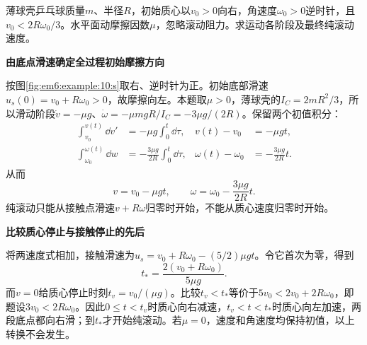\begin{question}\begin{example}[反向自转乒乓球的滑动与回滚]\label{em6:example:10}
薄球壳乒乓球质量$m$、半径$R$，初始质心以$v_0>0$向右，角速度$\omega_0>0$逆时针，且$v_0<2R\omega_0/3$。水平面动摩擦因数$\mu$，忽略滚动阻力。求运动各阶段及最终纯滚动速度。
\end{example}
\end{question}
\begin{solution}\textbf{由底点滑速确定全过程初始摩擦方向}\par\nobreak
按图\ref{fig:em6:example:10:s}取右、逆时针为正。初始底部滑速$u_s(0)=v_0+R\omega_0>0$，故摩擦向左。本题取$\mu>0$，薄球壳的$I_C=2mR^2/3$，所以滑动阶段$\dot v=-\mu g$、$\dot\omega=-\mu mgR/I_C=-3\mu g/(2R)$。保留两个初值积分：
\[
 \begin{aligned}
 \int_{v_0}^{v(t)}\dd v'&=-\mu g\int_0^t\dd\tau,
 &v(t)-v_0&=-\mu gt,\\
 \int_{\omega_0}^{\omega(t)}\dd w&=-\frac{3\mu g}{2R}\int_0^t\dd\tau,
 &\omega(t)-\omega_0&=-\frac{3\mu g}{2R}t.
 \end{aligned}
\]
从而
\[v=v_0-\mu gt,\qquad\omega=\omega_0-\frac{3\mu g}{2R}t.\]
纯滚动只能从接触点滑速$v+R\omega$归零时开始，不能从质心速度归零时开始。



\par\medskip{}\noindent\textbf{比较质心停止与接触停止的先后}\par\nobreak
将两速度式相加，接触滑速为$u_s=v_0+R\omega_0-(5/2)\mu gt$。令它首次为零，得到
\[
 t_* =\frac{2(v_0+R\omega_0)}{5\mu g}.
\]
而$v=0$给质心停止时刻$t_v=v_0/(\mu g)$。比较$t_v<t_*$等价于$5v_0<2v_0+2R\omega_0$，即题设$3v_0<2R\omega_0$。因此$0\le t<t_v$时质心向右减速，$t_v<t<t_*$时质心向左加速，两段底点都向右滑；到$t_*$才开始纯滚动。若$\mu=0$，速度和角速度均保持初值，以上转换不会发生。




\end{solution}
